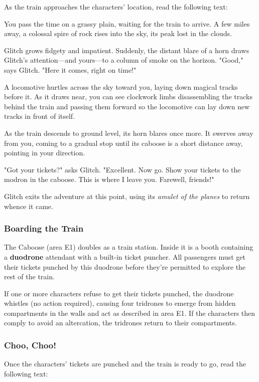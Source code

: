 \documentclass[10pt,a4paper,twoside,bg=print,twocolumn,openany,nodeprecatedcode]{dndarticle}
\begin{document}
As the train approaches the characters' location, read the following text:

\begin{DndReadAloud}{}
You pass the time on a grassy plain, waiting for the train to arrive. A few miles away, a colossal spire of rock rises into the sky, its peak lost in the clouds.

Glitch grows fidgety and impatient. Suddenly, the distant blare of a horn draws Glitch's attention—and yours—to a column of smoke on the horizon. "Good," says Glitch. "Here it comes, right on time!"

A locomotive hurtles across the sky toward you, laying down magical tracks before it. As it draws near, you can see clockwork limbs disassembling the tracks behind the train and passing them forward so the locomotive can lay down new tracks in front of itself.

As the train descends to ground level, its horn blares once more. It swerves away from you, coming to a gradual stop until its caboose is a short distance away, pointing in your direction.

"Got your tickets?" asks Glitch. "Excellent. Now go. Show your tickets to the modron in the caboose. This is where I leave you. Farewell, friends!"

\end{DndReadAloud}

Glitch exits the adventure at this point, using its \textit{amulet of the planes} to return whence it came.

\subsubsection{Boarding the Train}
The Caboose (area E1) doubles as a train station. Inside it is a booth containing a \textbf{duodrone} attendant with a built-in ticket puncher. All passengers must get their tickets punched by this duodrone before they're permitted to explore the rest of the train.

If one or more characters refuse to get their tickets punched, the duodrone whistles (no action required), causing four tridrones to emerge from hidden compartments in the walls and act as described in area E1. If the characters then comply to avoid an altercation, the tridrones return to their compartments.

\subsubsection{Choo, Choo!}
Once the characters' tickets are punched and the train is ready to go, read the following text:
\end{document}
